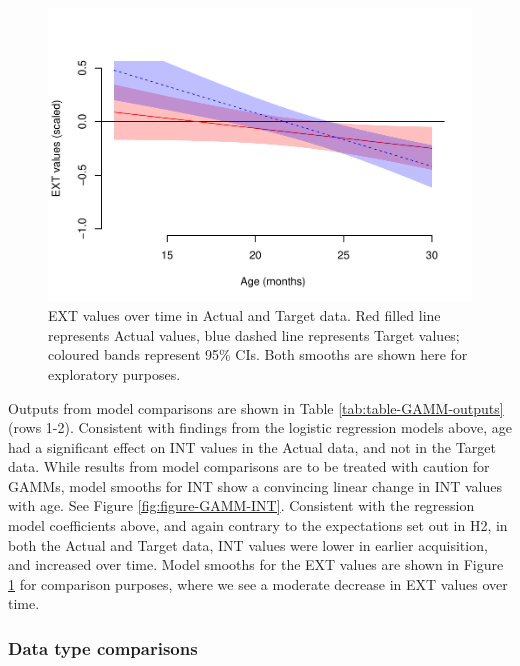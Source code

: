 \documentclass[
  man]{apa6}
\begin{document}
\begin{figure}
\centering
\includegraphics{PhonNetworksProj-revised_files/figure-latex/figure-GAMM-EXT-1.pdf}
\caption{\label{fig:figure-GAMM-EXT}EXT values over time in Actual and Target data. Red filled line represents Actual values, blue dashed line represents Target values; coloured bands represent 95\% CIs. Both smooths are shown here for exploratory purposes.}
\end{figure}

Outputs from model comparisons are shown in Table \ref{tab:table-GAMM-outputs} (rows 1-2). Consistent with findings from the logistic regression models above, age had a significant effect on INT values in the Actual data, and not in the Target data. While results from model comparisons are to be treated with caution for GAMMs, model smooths for INT show a convincing linear change in INT values with age. See Figure \ref{fig:figure-GAMM-INT}. Consistent with the regression model coefficients above, and again contrary to the expectations set out in H2, in both the Actual and Target data, INT values were lower in earlier acquisition, and increased over time. Model smooths for the EXT values are shown in Figure \ref{fig:figure-GAMM-EXT} for comparison purposes, where we see a moderate decrease in EXT values over time.

\hypertarget{data-type-comparisons}{%
\subsubsection{Data type comparisons}\label{data-type-comparisons}}
\end{document}
